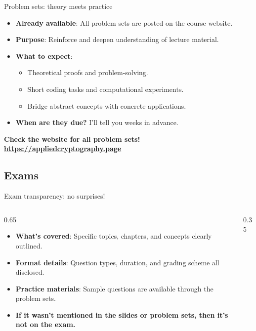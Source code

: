 \ifdefined\PRESENTATION\else\PassOptionsToClass{handout}{beamer}\fi\documentclass[aspectratio=169, lualatex]{beamer}
\begin{document}
\begin{frame}{Problem sets: theory meets practice}
	\begin{itemize}[<+->]
		\item \textbf{Already available}: All problem sets are posted on the course website.
		\item \textbf{Purpose}: Reinforce and deepen understanding of lecture material.
		\item \textbf{What to expect}:
		      \begin{itemize}
			      \item Theoretical proofs and problem-solving.
			      \item Short coding tasks and computational experiments.
			      \item Bridge abstract concepts with concrete applications.
		      \end{itemize}
		\item \textbf{When are they due?} I'll tell you weeks in advance.
	\end{itemize}
	\vspace{0.5cm}
	\begin{center}
		\Large\textcolor{cipherprimary}{\textbf{Check the website for all problem sets! \\ \url{https://appliedcryptography.page}}}
	\end{center}
\end{frame}

\subsection{Exams}

\begin{frame}{Exam transparency: no surprises!}
	\begin{columns}[c]
		\begin{column}{0.65\textwidth}
			\begin{itemize}[<+->]
				\item \textbf{What's covered}: Specific topics, chapters, and concepts clearly outlined.
				\item \textbf{Format details}: Question types, duration, and grading scheme all disclosed.
				\item \textbf{Practice materials}: Sample questions are available through the problem sets.
				\item \textbf{If it wasn't mentioned in the slides or problem sets, then it's not on the exam.}
			\end{itemize}
		\end{column}
		\begin{column}{0.35\textwidth}
		\end{column}
	\end{columns}
\end{frame}
\end{document}
